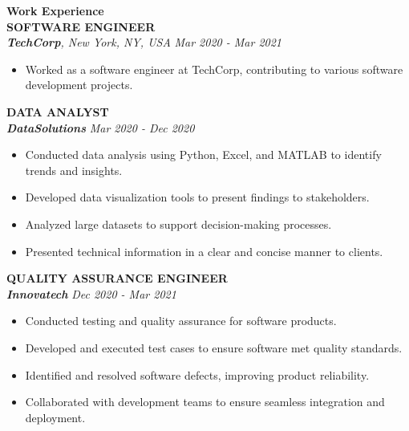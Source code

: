 \textcolor{accentcolor}{\textbf{\large {Work Experience}} }\\[0.2cm]

\textbf{\MakeUppercase{Software Engineer}} \\[0.1cm]
\textit{\textbf{TechCorp}, New York, NY, USA} \hfill \textit{Mar 2020 - Mar 2021}
\begin{itemize}[leftmargin=0.4cm]
    \item Worked as a software engineer at TechCorp, contributing to various software development projects.
\end{itemize}

\begin{tcolorbox}[colback=white, boxrule=0pt, enhanced, borderline west={1pt}{5pt}{accentcolor}, frame hidden]
    \textbf{\MakeUppercase{Data Analyst}} \\[0.1cm]
    \textit{\textbf{DataSolutions}} \hfill \textit{Mar 2020 - Dec 2020}
    \begin{itemize}[leftmargin=1cm]
        \item Conducted data analysis using Python, Excel, and MATLAB to identify trends and insights.
        \item Developed data visualization tools to present findings to stakeholders.
        \item Analyzed large datasets to support decision-making processes.
        \item Presented technical information in a clear and concise manner to clients.
    \end{itemize}
\end{tcolorbox}

\begin{tcolorbox}[colback=white, boxrule=0pt, enhanced, borderline west={1pt}{5pt}{accentcolor}, frame hidden]
    \textbf{\MakeUppercase{Quality Assurance Engineer}} \\[0.1cm]
    \textit{\textbf{Innovatech}} \hfill \textit{Dec 2020 - Mar 2021}
    \begin{itemize}[leftmargin=1cm]
        \item Conducted testing and quality assurance for software products.
        \item Developed and executed test cases to ensure software met quality standards.
        \item Identified and resolved software defects, improving product reliability.
        \item Collaborated with development teams to ensure seamless integration and deployment.
    \end{itemize}
\end{tcolorbox}